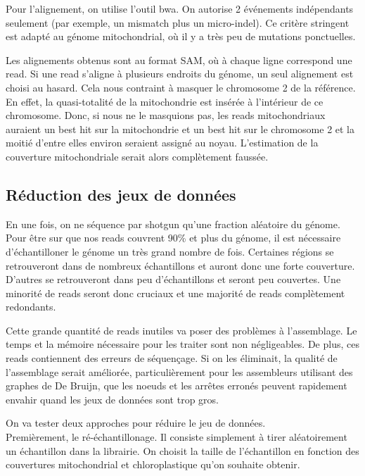 \documentclass[a4paper]{article}
\begin{document}
Pour l'alignement, on utilise l'outil bwa. On autorise 2 événements indépendants seulement (par exemple, un mismatch plus un micro-indel). Ce critère stringent est adapté au génome mitochondrial, où il y a très peu de mutations ponctuelles.

Les alignements obtenus sont au format SAM, où à chaque ligne correspond une read. Si une read s'aligne à plusieurs endroits du génome, un seul alignement est choisi au hasard. Cela nous contraint à masquer le chromosome 2 de la référence. En effet,  la quasi-totalité de la mitochondrie est insérée à l'intérieur de ce chromosome.\cite{chr2} Donc, si nous ne le masquions pas, les reads mitochondriaux auraient un best hit sur la mitochondrie et un best hit sur le chromosome 2 et la moitié d'entre elles environ seraient assigné au noyau. L'estimation de la couverture mitochondriale serait alors complètement faussée. 

\subsection{Réduction des jeux de données}

En une fois, on ne séquence par shotgun qu'une fraction aléatoire du génome. Pour être sur que nos reads couvrent 90\% et plus du génome, il est nécessaire d'échantilloner le génome un très grand nombre de fois. Certaines régions se retrouveront dans de nombreux échantillons et auront donc une forte couverture. D'autres se retrouveront dans peu d'échantillons et seront peu couvertes. Une minorité de reads seront donc cruciaux et une majorité de reads complètement redondants. 

Cette grande quantité de reads inutiles va poser des problèmes à l'assemblage. Le temps et la mémoire nécessaire pour les traiter sont non négligeables. De plus, ces reads contiennent des erreurs de séquençage. Si on les éliminait, la qualité de l'assemblage serait améliorée, particulièrement pour les assembleurs utilisant des graphes de De Bruijn, que les noeuds et les arrêtes erronés peuvent rapidement envahir quand les jeux de données sont trop gros.

On va tester deux approches pour réduire le jeu de données. \\

Premièrement, le ré-échantillonage. Il consiste simplement à tirer aléatoirement un échantillon dans la librairie. On choisit la taille de l'échantillon en fonction des couvertures mitochondrial et chloroplastique qu'on souhaite obtenir.
\end{document}
